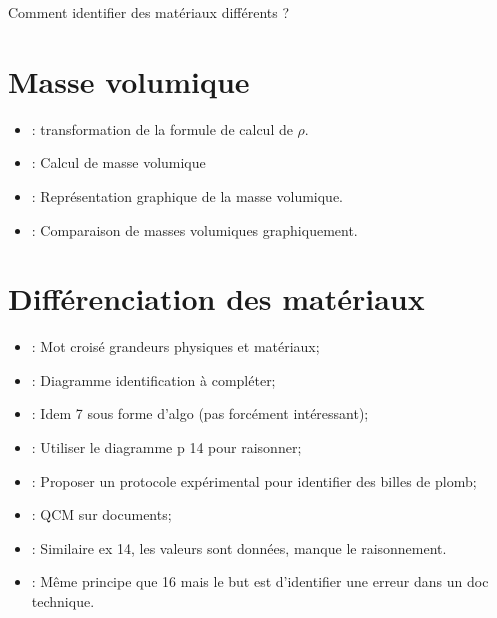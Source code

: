 \documentclass[12pt,a4paper]{article}
\date{}
\title{}
\begin{document}
	
	

\begin{mypb}
	\begin{center}
		{\Large Comment identifier des matériaux différents ?}
	\end{center}
\end{mypb}

\section{Masse volumique}






\begin{myexos}
	\begin{itemize}
		\item {} : transformation de la formule de calcul de $ \rho $.
		\item {} : Calcul de masse volumique
		\item {} : Représentation graphique de la masse volumique.
		\item {} : Comparaison de masses volumiques graphiquement.
	\end{itemize}
\end{myexos}

\newpage

\section{Différenciation des matériaux}





\begin{myexos}
	\begin{itemize}
		\item {} : Mot croisé grandeurs physiques et matériaux;
		\item {} : Diagramme identification à compléter;
		\item {} : Idem 7 sous forme d'algo (pas forcément intéressant);
		\item {} : Utiliser le diagramme p 14 pour raisonner;
		\item {} : Proposer un protocole expérimental pour identifier des billes de plomb;
		\item {} : QCM sur documents;
		\item {} : Similaire ex 14, les valeurs sont données, manque le raisonnement.
		\item {} : Même principe que 16 mais le but est d'identifier une erreur dans un doc technique.
		
		
	\end{itemize}
\end{myexos}
\end{document}
